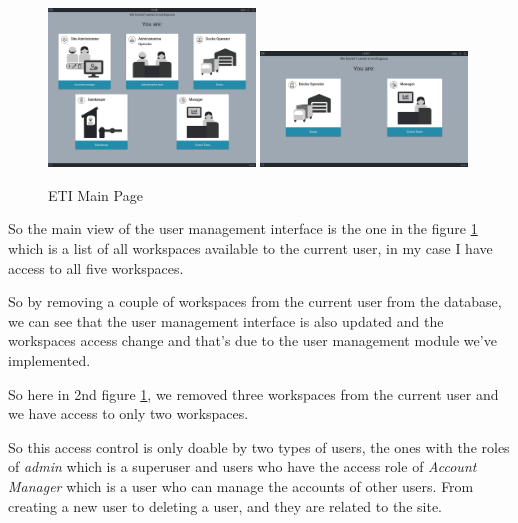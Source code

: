 \begin{figure}[!ht]
    \centering
    \includegraphics[width=0.49\textwidth]{images/user management}\hfill
    \includegraphics[width=0.49\textwidth]{images/userLessRoles}
    \caption{\footnotesize{ETI Main Page}}
    \label{fig:user_management_view}
\end{figure}

So the main view of the user management interface is the one in the figure
\ref{fig:user_management_view} which is a list of all workspaces available to the current
user, in my case I have access to all five workspaces.

So by removing a couple of workspaces from the current user from the database,
we can see that the user management interface is also updated and the workspaces
access change and that's due to the user management module we've implemented.

So here in 2nd figure \ref{fig:user_management_view}, we removed three workspaces from
the current user and we have access to only two workspaces.

So this access control is only doable by two types of users, the ones with the roles
of \textit{admin} which is a superuser and users who have the access role of
\textit{Account Manager} which is a user who can manage the accounts of other users.
From creating a new user to deleting a user, and they are related to the site.


